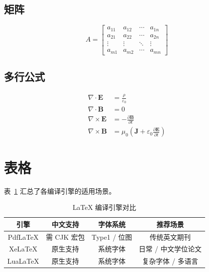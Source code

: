 \documentclass[a4paper,12pt]{ctexart}  %
\begin{document}
\subsection{矩阵}

\begin{equation}
    A = \begin{bmatrix}
        a_{11} & a_{12} & \cdots & a_{1n} \\
        a_{21} & a_{22} & \cdots & a_{2n} \\
        \vdots & \vdots & \ddots & \vdots \\
        a_{m1} & a_{m2} & \cdots & a_{mn}
    \end{bmatrix}
    \label{eq:matrix}
\end{equation}

\subsection{多行公式}

\begin{align}
    \nabla \cdot \mathbf{E} &= \frac{\rho}{\varepsilon_0} \\
    \nabla \cdot \mathbf{B} &= 0 \\
    \nabla \times \mathbf{E} &= -\frac{\partial \mathbf{B}}{\partial t} \\
    \nabla \times \mathbf{B} &= \mu_0 \left( \mathbf{J} + \varepsilon_0 \frac{\partial \mathbf{E}}{\partial t} \right)
\end{align}

\section{表格}
\label{sec:table}

表~\ref{tab:env} 汇总了各编译引擎的适用场景。

\begin{table}[h]
    \centering
    \caption{LaTeX 编译引擎对比}
    \label{tab:env}
    \begin{tabular}{|c|c|c|c|}
        \hline
        \textbf{引擎} & \textbf{中文支持} & \textbf{字体系统} & \textbf{推荐场景} \\
        \hline
        PdfLaTeX    & 需 CJK 宏包      & Type1 / 位图   & 传统英文期刊 \\
        XeLaTeX     & 原生支持         & 系统字体        & 日常 / 中文学位论文 \\
        LuaLaTeX    & 原生支持         & 系统字体        & 复杂字体 / 多语言 \\
        \hline
    \end{tabular}
\end{table}
\end{document}
